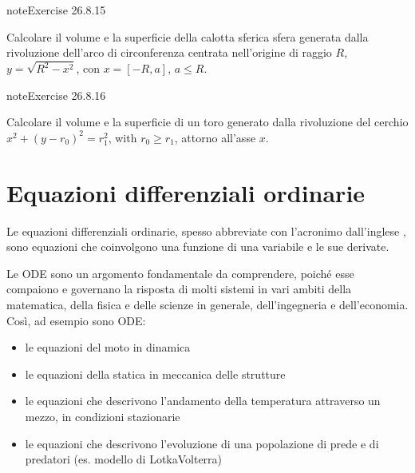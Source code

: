 \documentclass[letterpaper,10pt,italian]{jupyterBook}
\begin{document}
\begin{sphinxadmonition}{note}{Exercise 26.8.15}





\sphinxAtStartPar
Calcolare il volume e la superficie della calotta sferica sfera generata dalla rivoluzione dell’arco di circonferenza centrata nell’origine di raggio \(R\), \(y = \sqrt{R^2 - x^2}\), con \(x = [-R, a]\), \(a \le R\).
\end{sphinxadmonition}
 \label{exercise:ch/infinitesimal_calculus/integrals-problems-exercise-15}

\begin{sphinxadmonition}{note}{Exercise 26.8.16}





\sphinxAtStartPar
Calcolare il volume e la superficie di un toro generato dalla rivoluzione del cerchio \(x^2 + (y-r_0)^2 = r_1^2\), with \(r_0 \ge r_1\), attorno all’asse \(x\).
\end{sphinxadmonition}



\sphinxstepscope




\chapter{Equazioni differenziali ordinarie}
\label{\detokenize{ch/ode:equazioni-differenziali-ordinarie}}\label{\detokenize{ch/ode:ode-hs}}\label{\detokenize{ch/ode::doc}}
\sphinxAtStartPar
Le equazioni differenziali ordinarie, spesso abbreviate con l’acronimo  dall’inglese , sono equazioni che coinvolgono una funzione di una variabile e le sue derivate.

\sphinxAtStartPar
{} Le ODE sono un argomento fondamentale da comprendere, poiché esse compaiono e governano la risposta di molti sistemi in vari ambiti della matematica, della fisica e delle scienze in generale, dell’ingegneria e dell’economia. Così, ad esempio sono ODE:
\begin{itemize}
\item {} 
\sphinxAtStartPar
le equazioni del moto in dinamica

\item {} 
\sphinxAtStartPar
le equazioni della statica in meccanica delle strutture

\item {} 
\sphinxAtStartPar
le equazioni che descrivono l’andamento della temperatura attraverso un mezzo, in condizioni stazionarie

\item {} 
\sphinxAtStartPar
le equazioni che descrivono l’evoluzione di una popolazione di prede e di predatori (es. modello di Lotka\sphinxhyphen{}Volterra)

\end{itemize}
\end{document}
